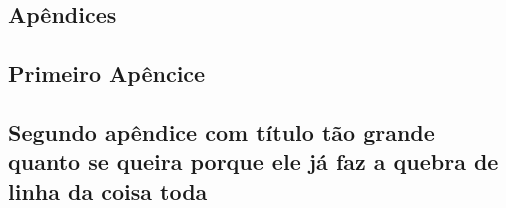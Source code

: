 
\begin{apendicesenv}
    \renewcommand{\partapendices}{\part*{Apêndices}}
    \partapendices

    \chapter{Primeiro Apêncice}

    \lipsum[50] %

    \chapter{Segundo apêndice com título tão grande quanto se queira porque ele
    já faz a quebra de linha da coisa toda}
    \lipsum[51-53] %
\end{apendicesenv}
